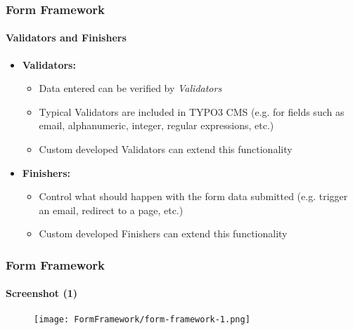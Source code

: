 \begin{frame}[fragile]
	\frametitle{Form Framework}
	\framesubtitle{Validators and Finishers}

	\begin{itemize}

		\item \textbf{Validators:}

			\begin{itemize}
				\item Data entered can be verified by \textit{Validators}
				\item Typical Validators are included in TYPO3 CMS
					(e.g. for fields such as email, alphanumeric, integer, regular expressions, etc.)
				\item Custom developed Validators can extend this functionality
			\end{itemize}

		\item \textbf{Finishers:}

			\begin{itemize}
				\item Control what should happen with the form data submitted
					(e.g. trigger an email, redirect to a page, etc.)
				\item Custom developed Finishers can extend this functionality
			\end{itemize}

	\end{itemize}

\end{frame}

\begin{frame}[fragile]
	\frametitle{Form Framework}
	\framesubtitle{Screenshot (1)}

	\begin{figure}
		\texttt{[image: FormFramework/form-framework-1.png]}
	\end{figure}

\end{frame}

